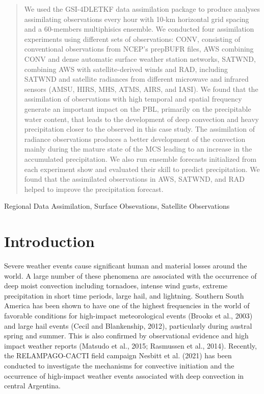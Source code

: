\documentclass[final,5p,times,twocolumn,authoryear]{elsarticle} %
\begin{document}
\begin{frontmatter}
\begin{abstract}
  We used the GSI-4DLETKF data assimilation package to produce analyses assimilating observations every hour with 10-km horizontal grid spacing and a 60-members multiphisics ensemble. We conducted four assimilation experiments using different sets of observations: CONV, consisting of conventional observations from NCEP's prepBUFR files, AWS combining CONV and dense automatic surface weather station networks, SATWND, combining AWS with satellite-derived winds and RAD, including SATWND and satellite radiances from different microwave and infrared sensors (AMSU, HIRS, MHS, ATMS, AIRS, and IASI). We found that the assimilation of observations with high temporal and spatial frequency generate an important impact on the PBL, primarily on the precipitable water content, that leads to the development of deep convection and heavy precipitation closer to the observed in this case study. The assimilation of radiance observations produces a better development of the convection mainly during the mature state of the MCS leading to an increase in the accumulated precipitation. We also run ensemble forecasts initialized from each experiment show and evaluated their skill to predict precipitation. We found that the assimilated observations in AWS, SATWND, and RAD helped to improve the precipitation forecast.
  \end{abstract}
   \begin{keyword} Regional Data Assimilation, Surface Obsevations, Satellite Observations\end{keyword}
 \end{frontmatter}

\hypertarget{introduction}{%
\section{Introduction}\label{introduction}}

Severe weather events cause significant human and material losses around the world. A large number of these phenomena are associated with the occurrence of deep moist convection including tornadoes, intense wind gusts, extreme precipitation in short time periods, large hail, and lightning.
Southern South America has been shown to have one of the highest frequencies in the world of favorable conditions for high-impact meteorological events (Brooks et al., 2003) and large hail events (Cecil and Blankenship, 2012), particularly during austral spring and summer.
This is also confirmed by observational evidence and high impact weather reports (Matsudo et al., 2015; Rasmussen et al., 2014). Recently, the RELAMPAGO-CACTI field campaign Nesbitt et al. (2021) has been conducted to investigate the mechanisms for convective initiation and the occurrence of high-impact weather events associated with deep convection in central Argentina.
\end{document}
